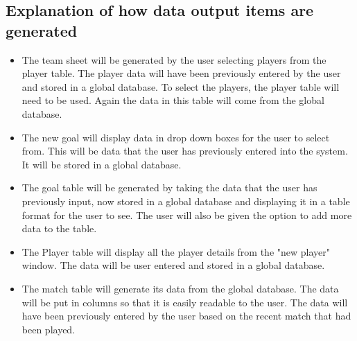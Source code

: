 \subsection{Explanation of how data output items are generated}
\begin{itemize}
\item The team sheet will be generated by the user selecting players from the player table. The player data will have been previously entered by the user and stored in a global database. To select the players, the player table will need to be used. Again the data in this table will come from the global database.  
\item The new goal will display data in drop down boxes for the user to select from. This will be data that the user has previously entered into the system. It will be stored in a global database. 
\item The goal table will be generated by taking the data that the user has previously input, now stored in a global database and displaying it in a table format for the user to see. The user will also be given the option to add more data to the table.
\item The Player table will display all the player details from the "new player" window. The data will be user entered and stored in a global database.
\item The match table will generate its data from the global database. The data will be put in columns so that it is easily readable to the user. The data will have been previously entered by the user based on the recent match that had been played.  
\end{itemize}

